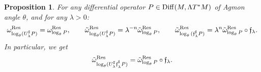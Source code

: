 \documentclass[10pt,a4paper]{amsart}
\numberwithin{equation}{section}
\newtheorem{prop}[thm]{Proposition}
\theoremstyle{definition}
\begin{document}
\begin{prop} \label{prop:pullbacklocalform} For any differential operator $P\in {\rm Diff}(M, \Lambda T^*M)$ of Agmon angle $\theta$, and for any $\lambda>0$:
\begin{gather}\label{eq:tildeu}
 \omega^{\rm Res}_{\log_\theta (U_\lambda^\sharp P)}=\omega^{\rm Res}_{\log_\theta P},\qquad \tilde \omega^{\rm Res}_{\log_\theta(U_\lambda^\sharp P)} =\lambda^{-n} \tilde \omega^{\rm Res}_{\log_\theta P},\qquad \tilde \omega^{ {\rm Res}}_{\log_\theta{({\mathfrak f}}_{ \lambda}^\sharp P)}=\lambda^{n} \tilde \omega^{\rm Res}_{\log_\theta P}\circ \mathfrak{f}_\lambda.
 \end{gather}
In particular, we get
	\begin{equation}\label{eq:tildeomegaflambda}
		\tilde \omega^{ {\rm Res}}_{\log_\theta({ U_\lambda^\sharp {\mathfrak f}}_{ \lambda}^\sharp P)}=\tilde \omega^{\rm Res}_{\log_\theta P}\circ {\mathfrak f}_{ \lambda}.\end{equation}
\end{prop}
\end{document}
